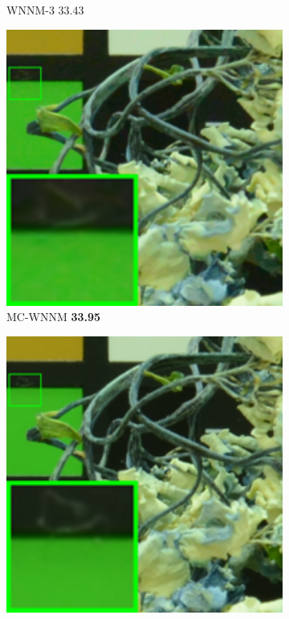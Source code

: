 \begin{figure}
\begin{subfigure}[t]{0.19\textwidth}
		\caption{WNNM-3 33.43}
    \end{subfigure}
    \hfill
    \begin{subfigure}[t]{0.19\textwidth}
        \centering
        \includegraphics[width=1\textwidth]{images/mcwnnm/cc/resize_br_CWNNM_ADMM_NL_CC15_d800_iso6400_2.png}
		\caption{MC-WNNM \textbf{33.95}}
    \end{subfigure}
    \hfill
    \begin{subfigure}[t]{0.19\textwidth}
        \centering
        \includegraphics[width=1\textwidth]{images/mcwnnm/cc/resize_br_d800_iso6400_2.png}

\end{subfigure}
\end{figure}
